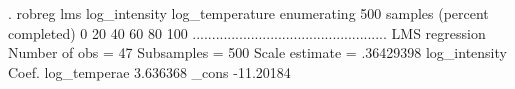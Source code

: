 . robreg lms log_intensity log_temperature
{\smallskip}
enumerating 500 samples (percent completed)
0  20  40  60  80  100
..................................................
{\smallskip}
LMS regression                                  Number of obs     =         47
                                                  Subsamples      =        500
                                                  Scale estimate  =  .36429398
{\smallskip}
log_intensity {\VBAR}      Coef.
log_tempera{\tytilde}e {\VBAR}   3.636368
        _cons {\VBAR}  -11.20184
{\smallskip}
